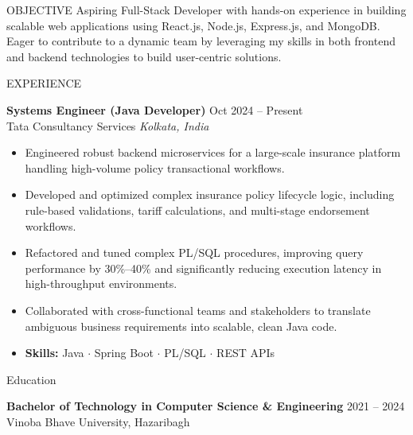 \documentclass{resume} %
\begin{document}
\begin{rSection}{OBJECTIVE}
Aspiring Full-Stack Developer with hands-on experience in building scalable web
applications using React.js, Node.js, Express.js, and MongoDB. Eager to contribute
to a dynamic team by leveraging my skills in both frontend and backend technologies
to build user-centric solutions.
\end{rSection}


\begin{rSection}{EXPERIENCE}

\textbf{Systems Engineer (Java Developer)} \hfill Oct 2024 -- Present\\
Tata Consultancy Services \hfill \textit{Kolkata, India}
\begin{itemize}
  \itemsep -3pt
  \item Engineered robust backend microservices for a large-scale insurance platform handling high-volume policy transactional workflows.
  \item Developed and optimized complex insurance policy lifecycle logic, including rule-based validations, tariff calculations, and multi-stage endorsement workflows.
  \item Refactored and tuned complex PL/SQL procedures, improving query performance by 30\%--40\% and significantly reducing execution latency in high-throughput environments.
  \item Collaborated with cross-functional teams and stakeholders to translate ambiguous business requirements into scalable, clean Java code.
  \item \textbf{Skills:} Java $\cdot$ Spring Boot  $\cdot$ PL/SQL $\cdot$ REST APIs
\end{itemize}

\end{rSection}


\begin{rSection}{Education}

{\bf Bachelor of Technology in Computer Science \& Engineering} \hfill {2021 -- 2024}\\
Vinoba Bhave University, Hazaribagh

\end{rSection}
\end{document}
